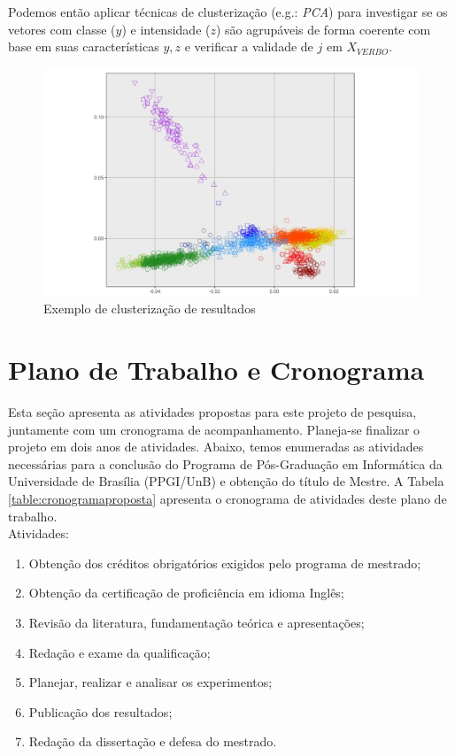 Podemos então aplicar técnicas de clusterização (e.g.: \textit{PCA}) para investigar se os vetores com classe ($y$) e intensidade ($z$) são agrupáveis de forma coerente com base em suas características $y, z$ e verificar a validade de $j$ em $X_{VERBO}$.

\begin{figure}[!h]
\centering
\includegraphics[width=1.0\textwidth]{imagens/p-naosupervisionado.png}
\caption{\label{fig:clusterizacaoresults}Exemplo de clusterização de resultados}
\end{figure}

\clearpage
\section{Plano de Trabalho e Cronograma}

Esta seção apresenta as atividades propostas para este projeto de pesquisa, juntamente com um cronograma de acompanhamento. Planeja-se finalizar o projeto em dois anos de atividades. Abaixo, temos enumeradas as atividades necessárias para a conclusão do Programa de Pós-Graduação em Informática da Universidade de Brasília (PPGI/UnB) e obtenção do título de Mestre. A Tabela \ref{table:cronogramaproposta} apresenta o cronograma de atividades deste plano de trabalho.\\

Atividades:

\begin{enumerate}
    \item Obtenção dos créditos obrigatórios exigidos pelo programa de mestrado;
    \item Obtenção da certificação de proficiência em idioma Inglês;
    \item Revisão da literatura, fundamentação teórica e apresentações;
    \item Redação e exame da qualificação;
    \item Planejar, realizar e analisar os experimentos;
    \item Publicação dos resultados;
    \item Redação da dissertação e defesa do mestrado.
\end{enumerate}

